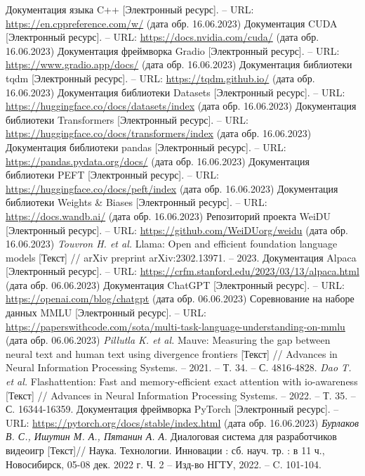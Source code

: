 \begin{thebibliography}{99}
  Документация языка C++ [Электронный ресурс]. -- URL: \url{https://en.cppreference.com/w/} (дата обр. 16.06.2023)
  Документация CUDA [Электронный ресурс]. -- URL: \url{https://docs.nvidia.com/cuda/} (дата обр. 16.06.2023)
  Документация фреймворка Gradio [Электронный ресурс]. -- URL: \url{https://www.gradio.app/docs/} (дата обр. 16.06.2023)
  Документация библиотеки tqdm [Электронный ресурс]. -- URL: \url{https://tqdm.github.io/} (дата обр. 16.06.2023)
  Документация библиотеки Datasets [Электронный ресурс]. -- URL: \url{https://huggingface.co/docs/datasets/index} (дата обр. 16.06.2023)
  Документация библиотеки Transformers [Электронный ресурс]. -- URL: \url{https://huggingface.co/docs/transformers/index} (дата обр. 16.06.2023)
  Документация библиотеки pandas [Электронный ресурс]. -- URL: \url{https://pandas.pydata.org/docs/} (дата обр. 16.06.2023)
  Документация библиотеки PEFT [Электронный ресурс]. -- URL: \url{https://huggingface.co/docs/peft/index} (дата обр. 16.06.2023)
  Документация библиотеки Weights \& Biases [Электронный ресурс]. -- URL: \url{https://docs.wandb.ai/} (дата обр. 16.06.2023)
  Репозиторий проекта WeiDU [Электронный ресурс]. -- URL: \url{https://github.com/WeiDUorg/weidu} (дата обр. 16.06.2023)
  \textit{Touvron H. et al.} Llama: Open and efficient foundation language models [Текст] // arXiv preprint arXiv:2302.13971. – 2023.
  Документация Alpaca [Электронный ресурс]. -- URL: \url{https://crfm.stanford.edu/2023/03/13/alpaca.html} (дата обр. 06.06.2023)
  Документация ChatGPT [Электронный ресурс]. -- URL: \url{https://openai.com/blog/chatgpt} (дата обр. 06.06.2023)
  Соревнование на наборе данных MMLU [Электронный ресурс]. -- URL: \url{https://paperswithcode.com/sota/multi-task-language-understanding-on-mmlu} (дата обр. 06.06.2023)
  \textit{Pillutla K. et al.} Mauve: Measuring the gap between neural text and human text using divergence frontiers [Текст] // Advances in Neural Information Processing Systems. – 2021. – Т. 34. – С. 4816-4828.
  \textit{Dao T. et al.} Flashattention: Fast and memory-efficient exact attention with io-awareness [Текст] // Advances in Neural Information Processing Systems. – 2022. – Т. 35. – С. 16344-16359.
  Документация фреймворка PyTorch [Электронный ресурс]. -- URL: \url{https://pytorch.org/docs/stable/index.html} (дата обр. 16.06.2023)
  \textit{Бурлаков В. С., Ишутин М. А., Пятанин А. А.} Диалоговая система для разработчиков видеоигр [Текст]// Наука. Технологии. Инновации : сб. науч. тр. : в 11 ч., Новосибирск, 05-08 дек. 2022 г. Ч. 2 -- Изд-во НГТУ, 2022. -- C. 101-104.
\end{thebibliography}